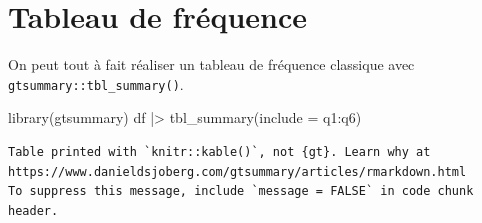 \documentclass[
  letterpaper,
  DIV=11,
  numbers=noendperiod,
  oneside]{scrreprt}
\newenvironment{Shaded}{\begin{snugshade}}{\end{snugshade}}
\newcommand{\AttributeTok}[1]{\textcolor[rgb]{0.40,0.45,0.13}{#1}}
\newcommand{\FunctionTok}[1]{\textcolor[rgb]{0.28,0.35,0.67}{#1}}
\newcommand{\NormalTok}[1]{\textcolor[rgb]{0.00,0.23,0.31}{#1}}
\newcommand{\SpecialCharTok}[1]{\textcolor[rgb]{0.37,0.37,0.37}{#1}}
\begin{document}
\hypertarget{tableau-de-fruxe9quence}{%
\section{Tableau de fréquence}\label{tableau-de-fruxe9quence}}

On peut tout à fait réaliser un tableau de fréquence classique avec
\texttt{gtsummary::tbl\_summary()}.

\begin{Shaded}
\begin{Highlighting}[]
\FunctionTok{library}\NormalTok{(gtsummary)}
\NormalTok{df }\SpecialCharTok{|\textgreater{}} 
  \FunctionTok{tbl\_summary}\NormalTok{(}\AttributeTok{include =}\NormalTok{ q1}\SpecialCharTok{:}\NormalTok{q6)}
\end{Highlighting}
\end{Shaded}

\begin{verbatim}
Table printed with `knitr::kable()`, not {gt}. Learn why at
https://www.danieldsjoberg.com/gtsummary/articles/rmarkdown.html
To suppress this message, include `message = FALSE` in code chunk header.
\end{verbatim}
\end{document}
